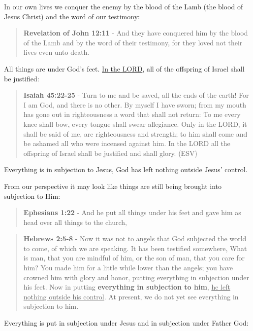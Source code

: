 \documentclass[11pt]{article}
\begin{document}
In our own lives we conquer the enemy by the blood of the Lamb (the blood of Jesus Christ) and the word of our testimony:

\begin{quote}
\textbf{Revelation of John 12:11} - And they have conquered him by the blood of the Lamb and by the word of their testimony, for they loved not their lives even unto death.
\end{quote}

All things are under God's feet. \uline{In the LORD}, all of the offspring of Israel shall be justified:

\begin{quote}
\textbf{Isaiah 45:22-25} - Turn to me and be saved, all the ends of the earth! For I am God, and there is no other. By myself I have sworn; from my mouth has gone out in righteousness a word that shall not return: To me every knee shall bow, every tongue shall swear allegiance. Only in the LORD, it shall be said of me, are righteousness and strength; to him shall come and be ashamed all who were incensed against him. In the LORD all the offspring of Israel shall be justified and shall glory. (ESV)
\end{quote}

Everything is in subjection to Jesus, God has left nothing outside Jesus' control.

From our perspective it may look like things are still being brought into subjection to Him:

\begin{quote}
\textbf{Ephesians 1:22} - And he put all things under his feet and gave him as head over all things to the church,
\end{quote}

\begin{quote}
\textbf{Hebrews 2:5-8} - Now it was not to angels that God subjected the world to come, of which we are speaking. It has been testified somewhere, What is man, that you are mindful of him, or the son of man, that you care for him? You made him for a little while lower than the angels; you have crowned him with glory and honor, putting everything in subjection under his feet. Now in putting \textbf{everything in subjection to him}, \uline{he left nothing outside his control}. At present, we do not yet see everything in subjection to him.
\end{quote}

Everything is put in subjection under Jesus and in subjection under Father God:
\end{document}
